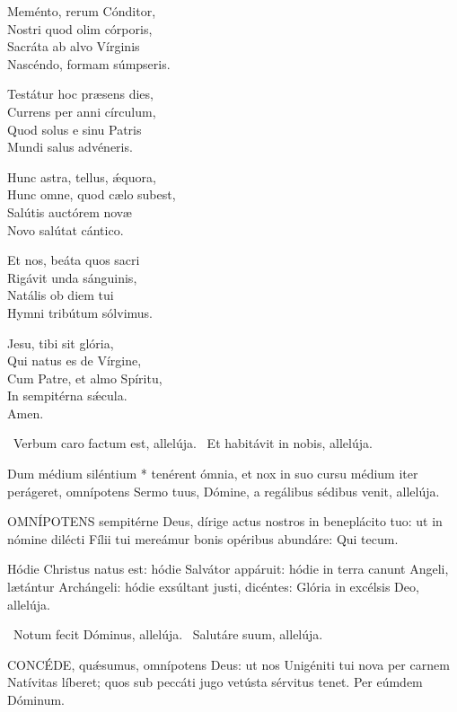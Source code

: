 Meménto, rerum Cónditor,\\
Nostri quod olim córporis,\\
Sacráta ab alvo Vírginis\\
Nascéndo, formam súmpseris.

Testátur hoc præsens dies,\\
Currens per anni círculum,\\
Quod solus e sinu Patris\\
Mundi salus advéneris.

Hunc astra, tellus, ǽquora,\\
Hunc omne, quod cælo subest,\\
Salútis auctórem novæ\\
Novo salútat cántico.

Et nos, beáta quos sacri\\
Rigávit unda sánguinis,\\
Natális ob diem tui\\
Hymni tribútum sólvimus.

Jesu, tibi sit glória,\\
Qui natus es de Vírgine,\\
Cum Patre, et almo Spíritu,\\
In sempitérna sǽcula.\\
Amen.

\V\ Verbum caro factum est, allelúja. \R\ Et habitávit in nobis, allelúja.

 Dum médium siléntium * tenérent ómnia, et nox in suo cursu médium iter perágeret, omnípotens Sermo tuus, Dómine, a regálibus sédibus venit, allelúja.


\lettrine[lines=2]{O}{MNÍPOTENS} sempitérne Deus, dírige actus nostros in beneplácito tuo: ut in nómine dilécti Fílii tui mereámur bonis opéribus abundáre: Qui tecum.


 Hódie Christus natus est: hódie Salvátor appáruit: hódie in terra canunt Angeli, lætántur Archángeli: hódie exsúltant justi, dicéntes: Glória in excélsis Deo, allelúja.

\V\ Notum fecit Dóminus, allelúja. \R\ Salutáre suum, allelúja.


\lettrine[lines=2]{C}{ONCÉDE}, quǽsumus, omnípotens Deus: ut nos Unigéniti tui nova per carnem Natívitas líberet; quos sub peccáti jugo vetústa sérvitus tenet. Per eúmdem Dóminum.

